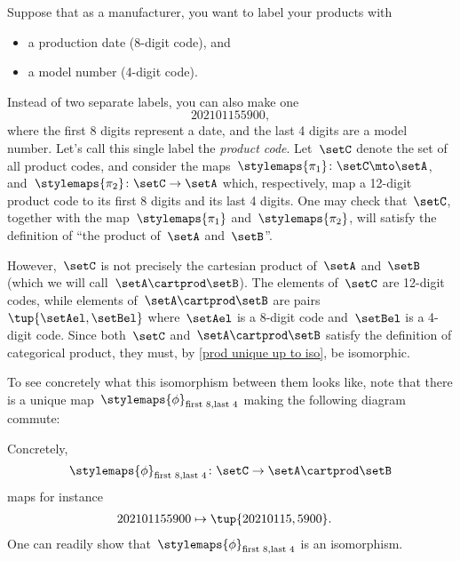 \begin{example}
	\label{ex:univ-prop-prod}
	Suppose that as a manufacturer, you want to label your products with
	\begin{itemize}
		\item a production date (8-digit code), and
		\item a model number (4-digit code).
	\end{itemize}
	Instead of two separate labels, you can also make one
	\begin{equation}
		\label{eq:exa-prod-univ-prop-code}
		202101155900,
	\end{equation}
	where the first 8 digits represent a date, and the last 4 digits are a model number.
	Let's call this single label the \emph{product code}.
	Let~$\setC$ denote the set of all product codes, and consider the maps~$\stylemaps{\pi_1}\colon \setC\mto \setA$, and~$\stylemaps{\pi_2}\colon \setC\to \setA$ which, respectively, map a 12-digit product code to its first 8 digits and its last 4 digits.
	One may check that~$\setC$, together with the map~$\stylemaps{\pi_1}$ and~$\stylemaps{\pi_2}$, will satisfy the definition of ``the product of~$\setA$ and~$\setB$''.

	\begin{center}
	\end{center}

	However,~$\setC$ is not precisely the cartesian product of~$\setA$ and~$\setB$ (which we will call~$\setA\cartprod \setB$).
	The elements of~$\setC$ are 12-digit codes, while elements of~$\setA\cartprod \setB$ are pairs~$\tup{\setAel,\setBel}$ where~$\setAel$ is a 8-digit code and~$\setBel$ is a 4-digit code.
	Since both~$\setC$ and~$\setA\cartprod \setB$ satisfy the definition of categorical product, they must, by \cref{prod unique up to iso}, be isomorphic.

	\begin{center}
	\end{center}

	To see concretely what this isomorphism between them looks like, note that there is a unique map~$\stylemaps{\phi}_{\text{first 8},\text{last 4}}$ making the following diagram commute:

	\begin{center}
	\end{center}

	Concretely,
	\begin{equation}
		\label{eq:exa-univ-iso}
		\stylemaps{\phi}_{\text{first 8},\text{last 4}}\colon \setC \to \setA\cartprod \setB
	\end{equation}
	maps for instance
	\begin{equation}
		\label{eq:exa-univ-iso-concrete}
		\begin{aligned}
			202101155900 & \mapsto \tup{20210115,5900}.
		\end{aligned}
	\end{equation}
	One can readily show that~$\stylemaps{\phi}_{\text{first 8},\text{last 4}}$ is an isomorphism.
\end{example}

